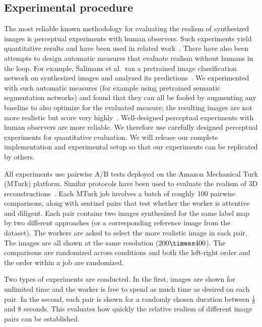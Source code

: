 \subsection{Experimental procedure}

The most reliable known methodology for evaluating the realism of synthesized images is perceptual experiments with human observers. Such experiments yield quantitative results and have been used in related work~\cite{Denton2015,Ledig2016,Salimans2016}. There have also been attempts to design automatic measures that evaluate realism without humans in the loop. For example, Salimans et al.\ ran a pretrained image classification network on synthesized images and analyzed its predictions~\cite{Salimans2016}. We experimented with such automatic measures (for example using pretrained semantic segmentation networks) and found that they can all be fooled by augmenting any baseline to also optimize for the evaluated measure; the resulting images are not more realistic but score very highly~\cite{Goodfellow2015,Nguyen2015}. Well-designed perceptual experiments with human observers are more reliable. We therefore use carefully designed perceptual experiments for quantitative evaluation. We will release our complete implementation and experimental setup so that our experiments can be replicated by others.

All experiments use pairwise A/B tests deployed on the Amazon Mechanical Turk (MTurk) platform. Similar protocols have been used to evaluate the realism of 3D reconstructions~\cite{Choi2015,Shan2013}.
Each MTurk job involves a batch of roughly 100 pairwise comparisons, along with sentinel pairs that test whether the worker is attentive and diligent. Each pair contains two images synthesized for the same label map by two different approaches (or a corresponding reference image from the dataset). The workers are asked to select the more realistic image in each pair. The images are all shown at the same resolution ($200\timess 400$). The comparisons are randomized across conditions and both the left-right order and the order within a job are randomized.

Two types of experiments are conducted. In the first, images are shown for unlimited time and the worker is free to spend as much time as desired on each pair. In the second, each pair is shown for a randomly chosen duration between $\frac{1}{8}$ and $8$ seconds. This evaluates how quickly the relative realism of different image pairs can be established.

